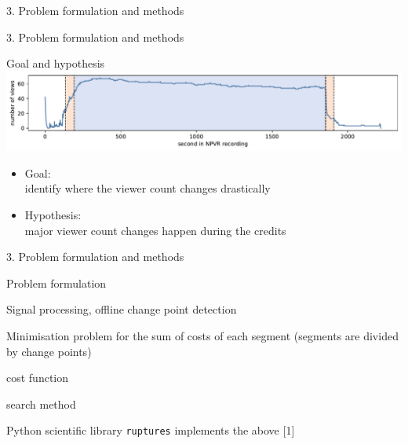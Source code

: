 \documentclass[first=orange,second=blue,logo=blueque]{aaltoslides}
\newcommand{\SubItem}[1]{
    {\setlength\itemindent{15pt} \item[$\bullet$] #1}
}
\begin{document}
\begin{frame}{3. Problem formulation and methods}
\end{frame}


\begin{frame}{3. Problem formulation and methods}
    \begin{block}{{\color{black}Goal and hypothesis}}
        \center
        \includegraphics[width=.95\textwidth]{../plots/sitcom.pdf}
        \begin{itemize}
            \item Goal: \\identify where the viewer count changes drastically
            \item Hypothesis: \\major viewer count changes happen during the credits
        \end{itemize}
    \end{block}
\end{frame}


\begin{frame}{3. Problem formulation and methods}
    \begin{block}{{\color{black}Problem formulation}}
        \begin{itemize}
            \item Signal processing, offline change point detection
            \item Minimisation problem for the sum of costs of each segment (segments are divided by change points)
                \SubItem{cost function}
                \SubItem{search method}
            \item Python scientific library \texttt{ruptures} implements the above [1]
        \end{itemize}
    \end{block}
\end{frame}
\end{document}
